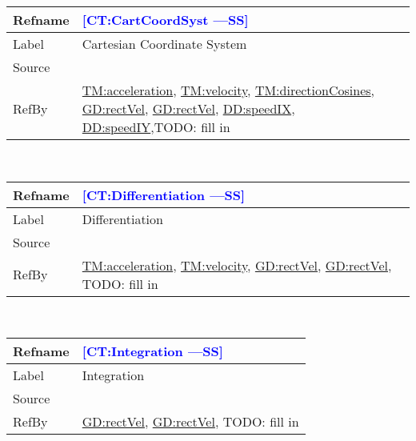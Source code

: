 \documentclass[12pt]{article}
\newcommand{\authornote}[3]{\textcolor{#1}{[#3 ---#2]}}
\newcommand{\authornote}[3]{}
\newcommand{\wss}[1]{\authornote{blue}{SS}{#1}}
\begin{document}
\medskip
\noindent
\begin{minipage}{\textwidth}
\begin{tabular}{>{\raggedright}p{}>{\raggedright\arraybackslash}p{}}
\toprule \textbf{Refname} & \textbf{\wss{CT:CartCoordSyst}}
\label{CT:CartCoordSyst}
\\ \midrule
Label & Cartesian Coordinate System
\\ \midrule
Source & \cite{}
\\ \midrule
RefBy & \hyperref[TM:acceleration]{TM:acceleration},
\hyperref[TM:velocity]{TM:velocity},
\hyperref[TM:directionCosines]{TM:directionCosines},
\hyperref[GD:rectVel]{GD:rectVel}, \hyperref[GD:rectVel]{GD:rectVel}, \hyperref[DD:speedIX]{DD:speedIX}, \hyperref[DD:speedIY]{DD:speedIY},TODO: fill in
\\ \bottomrule
\end{tabular}
\end{minipage}
~\\

\medskip
\noindent
\begin{minipage}{\textwidth}
\begin{tabular}{>{\raggedright}p{}>{\raggedright\arraybackslash}p{}}
\toprule \textbf{Refname} & \textbf{\wss{CT:Differentiation}}
\label{CT:Differentiation}
\\ \midrule
Label & Differentiation
\\ \midrule
Source & \cite{}
\\ \midrule
RefBy & \hyperref[TM:acceleration]{TM:acceleration},
\hyperref[TM:velocity]{TM:velocity}, \hyperref[GD:rectVel]{GD:rectVel}, \hyperref[GD:rectVel]{GD:rectVel}, TODO:
fill in 
\\ \bottomrule
\end{tabular}
\end{minipage}
~\\

\medskip
\noindent
\begin{minipage}{\textwidth}
\begin{tabular}{>{\raggedright}p{}>{\raggedright\arraybackslash}p{}}
\toprule \textbf{Refname} & \textbf{\wss{CT:Integration}}
\label{CT:Integration}
\\ \midrule
Label & Integration
\\ \midrule
Source & \cite{}
\\ \midrule
RefBy & \hyperref[GD:rectVel]{GD:rectVel}, \hyperref[GD:rectVel]{GD:rectVel}, TODO: fill in
\\ \bottomrule
\end{tabular}
\end{minipage}
~\\
\end{document}
